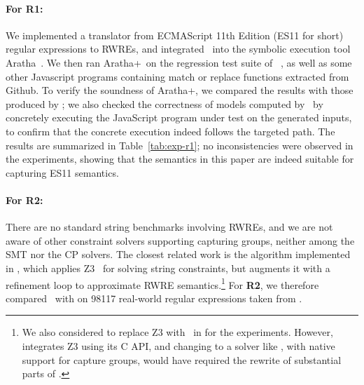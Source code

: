 \paragraph{For \textbf{R1}:} We implemented a translator from ECMAScript 11th Edition (ES11 for short) regular
expressions to RWREs, and integrated \ostrich\ into the symbolic
execution tool Aratha~\cite{aratha}. We then ran Aratha+\ostrich\ on
the regression test suite of \expose{}~\cite{DBLP:conf/spin/LoringMK17},
as well as some other Javascript programs containing match or replace
functions extracted from Github. To verify the soundness of
Aratha+\ostrich, we compared the results with those produced by
\expose{}; we also checked the correctness of models computed by
\ostrich\ by concretely executing the JavaScript program under test on
the generated inputs, to confirm that the concrete execution indeed
follows the targeted path. The results are summarized in Table~\ref{tab:exp-r1};
no inconsistencies were observed in the experiments, showing that the
semantics in this paper are indeed suitable for capturing ES11
semantics.

\vspace{-2mm}

\paragraph{For \textbf{R2}:} There are no standard string benchmarks
involving RWREs, and we are not aware of other constraint solvers
supporting capturing groups, neither among the SMT nor the CP
solvers. %
The closest related work is the algorithm implemented in \expose{}, which
applies Z3~\cite{Z3} for solving string constraints, but augments
it with a refinement loop to approximate RWRE
semantics.\footnote{We also considered to replace Z3 with \ostrich\ in
  \expose{} for the experiments. However, \expose{} integrates Z3 using its
  C API, and changing to a solver like \ostrich, with native support
  for capture groups, would have required the rewrite of substantial
  parts of \expose{}.}
%
For \textbf{R2}, we therefore compared \ostrich\ with \expose{} on 98117
real-world regular expressions taken from \cite{DMC+19}.

